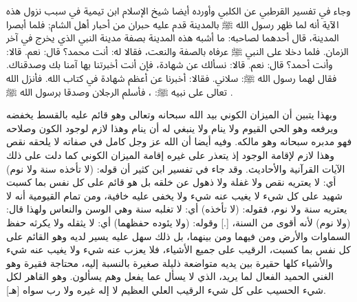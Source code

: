 وجاء في تفسير القرطبي عن الكلبي وأورده أيضا شيخ الإسلام ابن تيمية في سبب نزول هذه الآية أنه لما ظهر رسول الله ﷺ بالمدينة قدم عليه حبران من أحبار أهل الشام; فلما أبصرا المدينة، قال أحدهما لصاحبه: ما أشبه هذه المدينة بصفة مدينة النبي الذي يخرج في آخر الزمان. فلما دخلا على النبي ﷺ عرفاه بالصفة والنعت، فقالا له: أنت محمد؟ قال: نعم. قالا: وأنت أحمد؟ قال: نعم. قالا: نسألك عن شهادة، فإن أنت أخبرتنا بها آمنا بك وصدقناك. فقال لهما رسول الله ﷺ: سلاني. فقالا: أخبرنا عن أعظم شهادة في كتاب الله. فأنزل الله تعالى على نبيه ﷺ: \quranayah*[3][18]{\footnotesize \surahname*[3]}، فأسلم الرجلان وصدقا برسول الله ﷺ \href{https://shamela.ws/book/20855/1383#p4}{\faExternalLink} \cite{tafsir_Qurtubi}.


وبهذا يتبين أن الميزان الكوني بيد الله سبحانه وتعالى وهو قائم عليه بالقسط يخفضه ويرفعه وهو الحي القيوم ولا ينام ولا ينبغي له أن ينام وهذا لازم لوجود الكون وصلاحه فهو مدبره سبحانه وهو مالكه. وفيه أيضا أن الله عز وجل كامل في صفاته لا يلحقه نقص وهذا لازم لإقامة الوجود إذ يتعذر على غيره إقامة الميزان الكوني كما دلت على ذلك الآيات القرآنية والأحاديث. وقد جاء في تفسير ابن كثير أن قوله: (لا تأخذه سنة ولا نوم) أي: لا يعتريه نقص ولا غفلة ولا ذهول عن خلقه بل هو قائم على كل نفس بما كسبت شهيد على كل شيء لا يغيب عنه شيء ولا يخفى عليه خافية، ومن تمام القيومية أنه لا يعتريه سنة ولا نوم، فقوله: (لا تأخذه) أي: لا تغلبه سنة وهي الوسن والنعاس ولهذا قال: (ولا نوم) لأنه أقوى من السنة، [.] وقوله: (ولا يئوده حفظهما) أي: لا يثقله ولا يكرثه حفظ السماوات والأرض ومن فيهما ومن بينهما، بل ذلك سهل عليه يسير لديه وهو القائم على كل نفس بما كسبت، الرقيب على جميع الأشياء، فلا يعزب عنه شيء ولا يغيب عنه شيء والأشياء كلها حقيرة بين يديه متواضعة ذليلة صغيرة بالنسبة إليه، محتاجة فقيرة وهو الغني الحميد الفعال لما يريد، الذي لا يسأل عما يفعل وهم يسألون. وهو القاهر لكل شيء الحسيب على كل شيء الرقيب العلي العظيم لا إله غيره ولا رب سواه [هـ].

